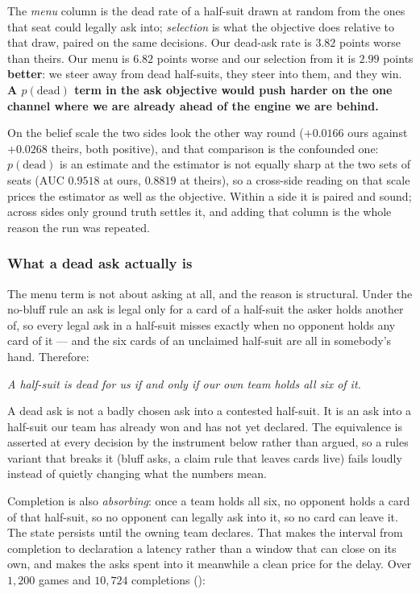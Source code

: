 \documentclass[11pt,letterpaper]{article}
\begin{document}
\noindent The \emph{menu} column is the dead rate of a half-suit drawn at
random from the ones that seat could legally ask into; \emph{selection} is what
the objective does relative to that draw, paired on the same decisions. Our
dead-ask rate is $3.82$ points worse than theirs. Our menu is $6.82$ points
worse and our selection from it is $2.99$ points \textbf{better}: we steer away
from dead half-suits, they steer into them, and they win. \textbf{A
$p(\text{dead})$ term in the ask objective would push harder on the one channel
where we are already ahead of the engine we are behind.}

On the belief scale the two sides look the other way round ($+0.0166$ ours
against $+0.0268$ theirs, both positive), and that comparison is the confounded
one: $p(\text{dead})$ is an estimate and the estimator is not equally sharp at
the two sets of seats ($\mathrm{AUC}$ $0.9518$ at ours, $0.8819$ at theirs), so
a cross-side reading on that scale prices the estimator as well as the
objective. Within a side it is paired and sound; across sides only ground truth
settles it, and adding that column is the whole reason the run was repeated.

\subsubsection{What a dead ask actually is}

The menu term is not about asking at all, and the reason is structural. Under
the no-bluff rule an ask is legal only for a card of a half-suit the asker
holds another of, so every legal ask in a half-suit misses exactly when no
opponent holds any card of it --- and the six cards of an unclaimed half-suit
are all in somebody's hand. Therefore:

\begin{center}
\emph{A half-suit is dead for us if and only if our own team holds all six of
it.}
\end{center}

\noindent A dead ask is not a badly chosen ask into a contested half-suit. It
is an ask into a half-suit our team has already won and has not yet declared.
The equivalence is asserted at every decision by the instrument below rather
than argued, so a rules variant that breaks it (bluff asks, a claim rule that
leaves cards live) fails loudly instead of quietly changing what the numbers
mean.

Completion is also \emph{absorbing}: once a team holds all six, no opponent
holds a card of that half-suit, so no opponent can legally ask into it, so no
card can leave it. The state persists until the owning team declares. That
makes the interval from completion to declaration a latency rather than a
window that can close on its own, and makes the asks spent into it meanwhile a
clean price for the delay. Over $1{,}200$ games and $10{,}724$ completions
():
\end{document}
